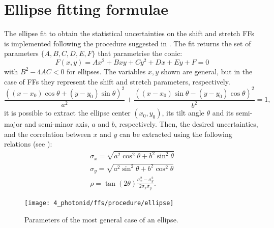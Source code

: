 \chapter{Ellipse fitting formulae}
\label{app:ellipse_formulae}

The ellipse fit to obtain the statistical uncertainties on the shift and stretch \acfp{FF} is implemented following the procedure suggested in . The fit returns the set of parameters \(\{A,B,C,D,E,F\}\) that parametrise the conic:
\begin{equation*}
    F(x,y) = Ax^2 + Bxy + Cy^2 + Dx + Ey + F = 0
\end{equation*}
with \(B^2 - 4AC < 0\) for ellipses. The variables \(x,y\) shown are general, but in the case of \acp{FF} they represent the shift and stretch parameters, respectively.
\begin{equation}
    \frac{((x-x_0)\cos\theta + (y-y_0)\sin\theta)^2}{a^2} + \frac{((x-x_0)\sin\theta - (y-y_0)\cos\theta)^2}{b^2} = 1,
\end{equation}
it is possible to extract the ellipse center \((x_0, y_0)\), its tilt angle \(\theta\) and its semi-major and semi-minor axis, \(a\) and \(b\), respectively. Then, the desired uncertainties, and the correlation between \(x\) and \(y\) can be extracted using the following relations (see \Fig{\ref{fig:ellipse_formulae:ellipse}}):
\begin{gather}
    \sigma_x = \sqrt{a^2 \cos^2\theta + b^2 \sin^2\theta}\\
    \sigma_y = \sqrt{a^2 \sin^2\theta + b^2 \cos^2\theta}\\
    \rho = \tan(2\theta) \frac{\sigma_{x}^2-\sigma_{y}^2}{2\sigma_{x}\sigma_{y}}.
\end{gather}

\begin{figure}[ht!]
    \centering
    \texttt{[image: 4\_photonid/ffs/procedure/ellipse]}
    \caption{Parameters of the most general case of an ellipse.}
    \label{fig:ellipse_formulae:ellipse}
\end{figure}
